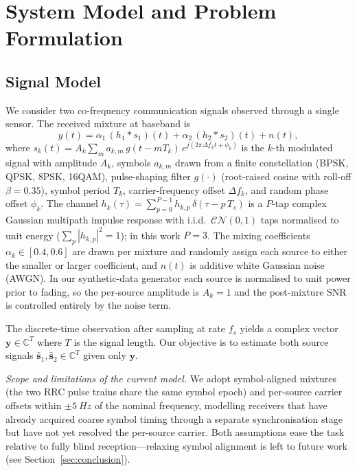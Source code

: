 \documentclass[twocolumn,english]{svjour3}
\begin{document}
\section{System Model and Problem Formulation}
\label{sec:system}

\subsection{Signal Model}

We consider two co-frequency communication signals observed through a single sensor. The received mixture at baseband is
\begin{equation}
    y(t) = \alpha_1\, (h_1 \ast s_1)(t) + \alpha_2\, (h_2 \ast s_2)(t) + n(t),
    \label{eq:mixture}
\end{equation}
where $s_k(t) = A_k \sum_{m} a_{k,m}\, g(t - m T_k)\, e^{j(2\pi \Delta f_k t + \phi_k)}$ is the $k$-th modulated signal with amplitude $A_k$, symbols $a_{k,m}$ drawn from a finite constellation (BPSK, QPSK, 8PSK, 16QAM), pulse-shaping filter $g(\cdot)$ (root-raised cosine with roll-off $\beta=0.35$), symbol period $T_k$, carrier-frequency offset $\Delta f_k$, and random phase offset $\phi_k$. The channel $h_k(\tau) = \sum_{p=0}^{P-1} h_{k,p}\, \delta(\tau - p\, T_s)$ is a $P$-tap complex Gaussian multipath impulse response with i.i.d.\ $\mathcal{CN}(0,1)$ taps normalised to unit energy ($\sum_p |h_{k,p}|^2 = 1$); in this work $P=3$. The mixing coefficients $\alpha_k \in [0.4, 0.6]$ are drawn per mixture and randomly assign each source to either the smaller or larger coefficient, and $n(t)$ is additive white Gaussian noise (AWGN). In our synthetic-data generator each source is normalised to unit power prior to fading, so the per-source amplitude is $A_k = 1$ and the post-mixture SNR is controlled entirely by the noise term.

The discrete-time observation after sampling at rate $f_s$ yields a complex vector $\mathbf{y} \in \mathbb{C}^{T}$ where $T$ is the signal length. Our objective is to estimate both source signals $\hat{\mathbf{s}}_1, \hat{\mathbf{s}}_2 \in \mathbb{C}^{T}$ given only $\mathbf{y}$.

\begin{sloppypar}
\emph{Scope and limitations of the current model.} We adopt symbol-aligned mixtures (the two RRC pulse trains share the same symbol epoch) and per-source carrier offsets within $\pm \SI{5}{Hz}$ of the nominal frequency, modelling receivers that have already acquired coarse symbol timing through a separate synchronisation stage but have not yet resolved the per-source carrier. Both assumptions ease the task relative to fully blind reception---relaxing symbol alignment is left to future work (see Section~\ref{sec:conclusion}).
\end{sloppypar}
\end{document}
